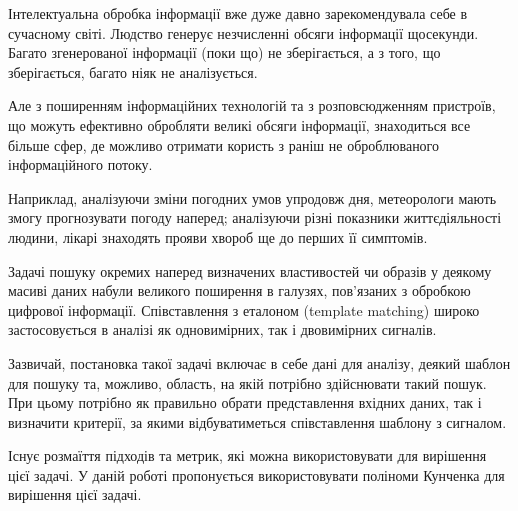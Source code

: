 \intro{}
Інтелектуальна обробка інформації вже дуже давно зарекомендувала себе в сучасному світі.
Людство генерує незчисленні обсяги інформації щосекунди.
Багато згенерованої інформації (поки що) не зберігається, а з того, що зберігається, багато ніяк не аналізується.

Але з поширенням інформаційних технологій та з розповсюдженням пристроїв, що можуть ефективно обробляти великі обсяги
інформації, знаходиться все більше сфер, де можливо отримати користь з раніш не оброблюваного інформаційного потоку.

Наприклад, аналізуючи зміни погодних умов упродовж дня, метеорологи мають змогу прогнозувати погоду наперед;
аналізуючи різні показники життєдіяльності людини, лікарі знаходять прояви хвороб ще до перших її симптомів.

Задачі пошуку окремих наперед визначених властивостей чи образів у деякому масиві даних набули великого поширення в
галузях, пов’язаних з обробкою цифрової інформації.
Співставлення з еталоном (template matching) широко застосовується в аналізі як одновимірних, так і двовимірних
сигналів.

Зазвичай, постановка такої задачі включає в себе дані для аналізу, деякий шаблон для пошуку та, можливо, область, на
якій потрібно здійснювати такий пошук.  При цьому потрібно як правильно обрати представлення вхідних даних, так і
визначити критерії, за якими відбуватиметься співставлення шаблону з сигналом.

Існує розмаїття підходів та метрик, які можна використовувати для вирішення цієї задачі.  У даній роботі пропонується
використовувати поліноми Кунченка для вирішення цієї задачі.

